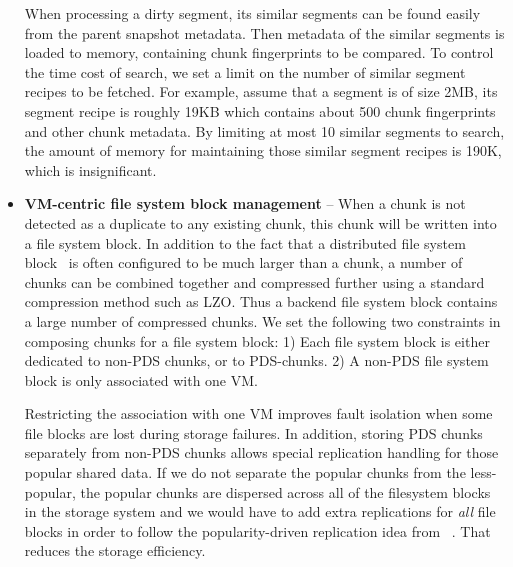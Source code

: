 \begin{itemize}
When processing a dirty segment,
its  similar segments can be found easily from the
parent snapshot metadata.  Then metadata of the similar segments is loaded to memory,
containing chunk fingerprints to be compared.
To control the time cost of search, we set a limit on the number of  similar segment recipes to be fetched. 
For example, assume that  a segment is of size  2MB, 
its segment recipe is roughly 19KB which contains about 500 chunk fingerprints and other chunk metadata.
By limiting at most 10 similar segments to search, the amount of memory for maintaining those 
similar segment recipes is 190K, which is insignificant. 


\item 
\textbf{VM-centric file system block management} --
When a chunk is not detected as a duplicate to any existing chunk, this chunk will be written
into a file system block.  
In addition to the fact that a distributed file system block~\cite{googlefs03,hdfs10} is often
configured to be much  larger than a chunk, a number of chunks can be combined together
and compressed further using a standard compression method such as LZO. 
Thus a  backend file system block contains a large number of compressed chunks.
We set the following two constraints in composing chunks for a file system block:
1) Each file system block is either dedicated to non-PDS chunks, or to PDS-chunks.
2) A non-PDS file system block is only associated with one VM.

Restricting the association with one VM improves fault isolation when some file blocks are lost during 
storage failures. 
In addition, storing PDS chunks separately from non-PDS chunks
allows special replication handling for those popular shared data. 
If we do not separate the
popular chunks from the less-popular, the popular chunks are dispersed across
all of the filesystem blocks in the storage system and we would have
to add extra replications for {\em all} file blocks in order to   follow the popularity-driven replication idea 
from ~\cite{Reliability06}. That reduces the storage efficiency.




\end{itemize}
